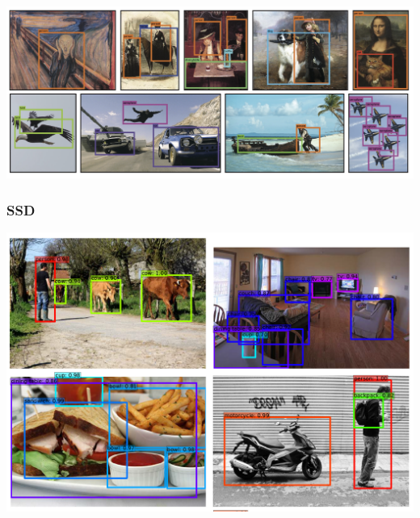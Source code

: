 \begin{frame}[allowframebreaks]
\begin{center}
	\includegraphics[scale=0.5]{figs/YOLO_results_pictures}
\end{center}


\end{frame}


\begin{frame}
	\frametitle{SSD}

	\begin{center}
		\includegraphics[scale=0.6]{figs/SSD_results_pictures}
	\end{center}

\end{frame}

